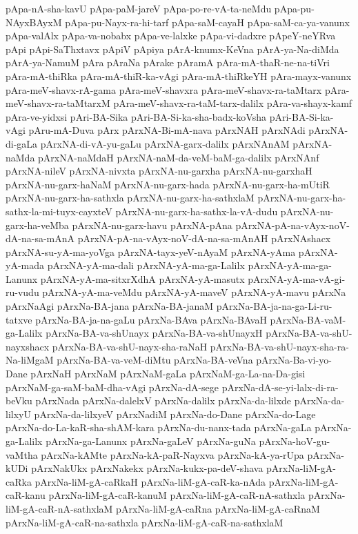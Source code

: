 {pApa-nA-sha-kavU
pApa-paM-jareV
pApa-po-re-vA-ta-neMdu
pApa-pu-NAyxBAyxM
pApa-pu-Nayx-ra-hi-tarf
pApa-saM-cayaH
pApa-saM-ca-ya-vanunx
pApa-valAlx
pApa-va-nobabx
pApa-ve-lalxke
pApa-vi-dadxre
pApeY-neYRva
pApi
pApi-SaThxtavx
pApiV
pApiya
pArA-knumx-KeVna
pArA-ya-Na-diMda
pArA-ya-NamuM
pAra
pAraNa
pArake
pAramA
pAra-mA-thaR-ne-na-tiVri
pAra-mA-thiRka
pAra-mA-thiR-ka-vAgi
pAra-mA-thiRkeYH
pAra-mayx-vanunx
pAra-meV-shavx-rA-gama
pAra-meV-shavxra
pAra-meV-shavx-ra-taMtarx
pAra-meV-shavx-ra-taMtarxM
pAra-meV-shavx-ra-taM-tarx-dalilx
pAra-va-shayx-kamf
pAra-ve-yidxsi
pAri-BA-Sika
pAri-BA-Si-ka-sha-badx-koVsha
pAri-BA-Si-ka-vAgi
pAru-mA-Duva
pArx
pArxNA-Bi-mA-nava
pArxNAH
pArxNAdi
pArxNA-di-gaLa
pArxNA-di-vA-yu-gaLu
pArxNA-garx-dalilx
pArxNAnAM
pArxNA-naMda
pArxNA-naMdaH
pArxNA-naM-da-veM-baM-ga-dalilx
pArxNAnf
pArxNA-nileV
pArxNA-nivxta
pArxNA-nu-garxha
pArxNA-nu-garxhaH
pArxNA-nu-garx-haNaM
pArxNA-nu-garx-hada
pArxNA-nu-garx-ha-mUtiR
pArxNA-nu-garx-ha-sathxla
pArxNA-nu-garx-ha-sathxlaM
pArxNA-nu-garx-ha-sathx-la-mi-tuyx-cayxteV
pArxNA-nu-garx-ha-sathx-la-vA-dudu
pArxNA-nu-garx-ha-veMba
pArxNA-nu-garx-havu
pArxNA-pAna
pArxNA-pA-na-vAyx-noV-dA-na-sa-mAnA
pArxNA-pA-na-vAyx-noV-dA-na-sa-mAnAH
pArxNAshacx
pArxNA-su-yA-ma-yoVga
pArxNA-tayx-yeV-nAyaM
pArxNA-yAma
pArxNA-yA-mada
pArxNA-yA-ma-dali
pArxNA-yA-ma-ga-Lalilx
pArxNA-yA-ma-ga-Lanunx
pArxNA-yA-ma-sitxrXdhA
pArxNA-yA-masutx
pArxNA-yA-ma-vA-gi-ru-vudu
pArxNA-yA-ma-veMdu
pArxNA-yA-maveV
pArxNA-yA-mavu
pArxNa
pArxNaAgi
pArxNa-BA-jana
pArxNa-BA-janaM
pArxNa-BA-ja-na-ga-Li-ru-tatxve
pArxNa-BA-ja-na-gaLu
pArxNa-BAva
pArxNa-BAvaH
pArxNa-BA-vaM-ga-Lalilx
pArxNa-BA-va-shUnayx
pArxNa-BA-va-shUnayxH
pArxNa-BA-va-shU-nayxshacx
pArxNa-BA-va-shU-nayx-sha-raNaH
pArxNa-BA-va-shU-nayx-sha-ra-Na-liMgaM
pArxNa-BA-va-veM-diMtu
pArxNa-BA-veVna
pArxNa-Ba-vi-yo-Dane
pArxNaH
pArxNaM
pArxNaM-gaLa
pArxNaM-ga-La-na-Da-gisi
pArxNaM-ga-saM-baM-dha-vAgi
pArxNa-dA-sege
pArxNa-dA-se-yi-lalx-di-ra-beVku
pArxNada
pArxNa-dalelxV
pArxNa-dalilx
pArxNa-da-lilxde
pArxNa-da-lilxyU
pArxNa-da-lilxyeV
pArxNadiM
pArxNa-do-Dane
pArxNa-do-Lage
pArxNa-do-La-kaR-sha-shAM-kara
pArxNa-du-nanx-tada
pArxNa-gaLa
pArxNa-ga-Lalilx
pArxNa-ga-Lanunx
pArxNa-gaLeV
pArxNa-guNa
pArxNa-hoV-gu-vaMtha
pArxNa-kAMte
pArxNa-kA-paR-Nayxva
pArxNa-kA-ya-rUpa
pArxNa-kUDi
pArxNakUkx
pArxNakekx
pArxNa-kukx-pa-deV-shava
pArxNa-liM-gA-caRka
pArxNa-liM-gA-caRkaH
pArxNa-liM-gA-caR-ka-nAda
pArxNa-liM-gA-caR-kanu
pArxNa-liM-gA-caR-kanuM
pArxNa-liM-gA-caR-nA-sathxla
pArxNa-liM-gA-caR-nA-sathxlaM
pArxNa-liM-gA-caRna
pArxNa-liM-gA-caRnaM
pArxNa-liM-gA-caR-na-sathxla
pArxNa-liM-gA-caR-na-sathxlaM
}
